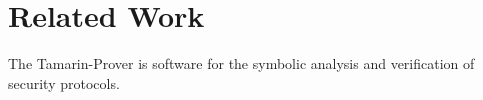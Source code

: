 \documentclass[11pt, pdftex]{article}
\begin{document}
  









  

  

















\section{Related Work}
The Tamarin-Prover is software for the symbolic analysis and verification of security protocols.



     
\nocite{*}


\end{document}
